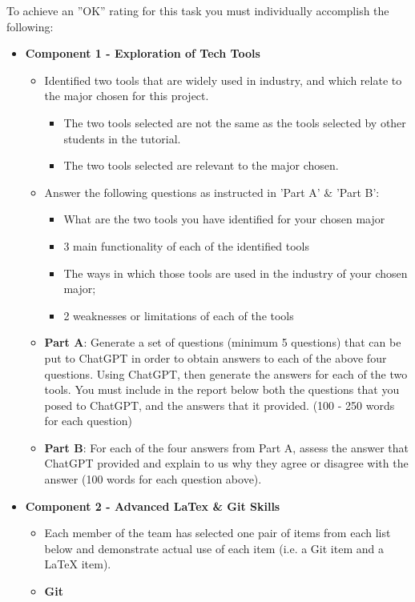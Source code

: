 \documentclass[a4paper, 11pt]{report}
\begin{document}
{{To achieve an ''OK'' rating for this task you must individually accomplish the following:
\begin{itemize}
\item \textbf{Component 1 - Exploration of Tech Tools}
	\begin{itemize}
	\item Identified two tools that are widely used in industry, and which relate to the major chosen for this project.
		\begin{itemize}
		\item The two tools selected are not the same as the tools selected by other students in the tutorial. 
		\item The two tools selected are relevant to the major chosen.
		\end{itemize}
	\item Answer the following questions as instructed in 'Part A' \& 'Part B':
		\begin{itemize}
		\item What are the two tools you have identified for your chosen major
		\item 3 main functionality of each of the identified tools
		\item The ways in which those tools are used in the industry of your chosen major;
		\item 2 weaknesses or limitations of each of the tools
		\end{itemize}
	\item \textbf{Part A}: Generate a set of questions (minimum 5 questions) that can be put to ChatGPT in order to obtain answers to each of the above four questions. Using ChatGPT, then generate the answers for each of the two tools. You must include in the report below both the questions that you posed to ChatGPT, and the answers that it provided. (100 - 250 words for each question)
	\item \textbf{Part B}: For each of the four answers from Part A, assess the answer that ChatGPT provided and explain to us why they agree or disagree with the answer (100 words for each question above).
	\end{itemize}
\item \textbf{Component 2 - Advanced LaTex \& Git Skills}
	\begin{itemize}
	\item Each member of the team has selected one pair of items from each list below and demonstrate actual use of each item (i.e. a Git item and a LaTeX item).
	\item \textbf{Git}

\end{itemize}
\end{itemize}}}
\end{document}
